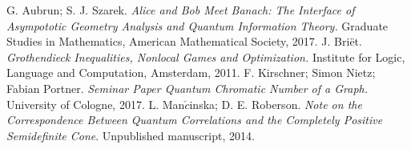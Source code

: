 %
\newpage 
\begin{thebibliography}{99999}
	
	
	 G. Aubrun; S. J. Szarek. {\em Alice and Bob Meet Banach: The Interface of Asympototic Geometry Analysis and Quantum Information Theory.} Graduate Studies in Mathematics, American Mathematical Society, 2017.
	J. Bri\"{e}t. {\em Grothendieck Inequalities, Nonlocal Games and Optimization.} Institute for Logic, Language and Computation, Amsterdam, 2011.
	 F. Kirschner; Simon Nietz; Fabian Portner. {\em Seminar Paper Quantum Chromatic Number of a Graph.} University of Cologne, 2017.
	 L. Man$\check{c}$inska; D. E. Roberson. {\em Note on the Correspondence Between Quantum Correlations and the Completely Positive Semidefinite Cone}. Unpublished manuscript, 2014.
	
	
	
\end{thebibliography}
	
